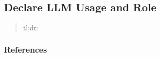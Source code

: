 



\subsection{Declare LLM Usage and Role}
\label{sec:declare-llm-usage-and-role}

\begin{quote}
\underline{tl;dr:}  
\end{quote}



\subsubsection{References}





